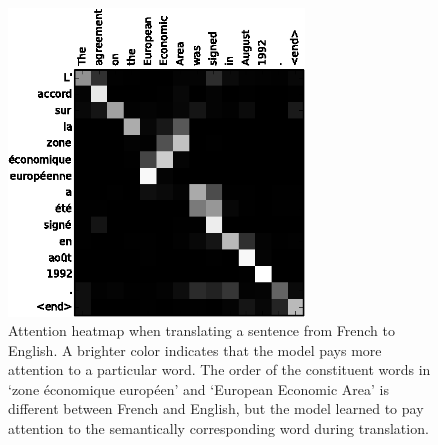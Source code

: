 
\begin{figure}
	\centering\includegraphics[width=0.7\textwidth]{../visualizations/ch4-methods/attention_heatmap.png} 
	\caption{Attention heatmap when translating a sentence from French to English. A brighter color indicates that the model pays more attention to a particular word. The order of the constituent words in `zone \'economique europ\'een' and `European Economic Area' is different between French and English, but the model learned to pay attention to the semantically corresponding word during translation. }
	\label{fig:attention_heatmap}
\end{figure}



